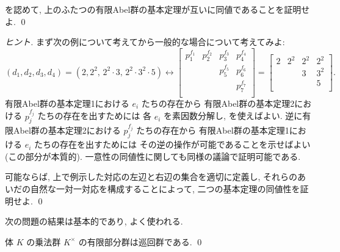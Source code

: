 \documentclass[12pt,twoside]{jarticle}
\begin{document}
\begin{question}
 を認めて, 
 上のふたつの有限Abel群の基本定理が互いに同値であることを証明せよ.
 \qed
\end{question}

\begin{proof}[ヒント]
 まず次の例について考えてから一般的な場合について考えてみよ:
 \begin{equation*}
  (d_1,d_2,d_3,d_4)=(2, 2^2,\, 2^2\cdot 3,\, 2^2\cdot 3^2\cdot 5)
  \leftrightarrow
  \begin{bmatrix}
   p_1^{f_1} & p_2^{f_2} & p_3^{f_3} & p_4^{f_4}\\
             &           & p_5^{f_5} & p_6^{f_6} \\
             &           &           & p_7^{f_7} \\
  \end{bmatrix}
  =
  \begin{bmatrix}
   2 & 2^2 & 2^2 & 2^2 \\
     &     & 3   & 3^2 \\
     &     &     & 5 \\
  \end{bmatrix}.
 \end{equation*}
 有限Abel群の基本定理1における $e_i$ たちの存在から 
 有限Abel群の基本定理2における $p_j^{f_j}$ たちの存在を出すためには
 各 $e_i$ を素因数分解し, を使えばよい.
 逆に有限Abel群の基本定理2における $p_j^{f_j}$ たちの存在から 
 有限Abel群の基本定理1における $e_i$ たちの存在を出すためには
 その逆の操作が可能であることを示せばよい(この部分が本質的).
 一意性の同値性に関しても同様の議論で証明可能である.

 可能ならば, 上で例示した対応の左辺と右辺の集合を適切に定義し, 
 それらのあいだの自然な一対一対応を構成することによって, 
 二つの基本定理の同値性を証明せよ.
 \qed
\end{proof}

次の問題の結果は基本的であり, よく使われる.

\begin{question}
 体 $K$ の乗法群 $K^\times$ の有限部分群は巡回群である. \qed
\end{question}
\end{document}
